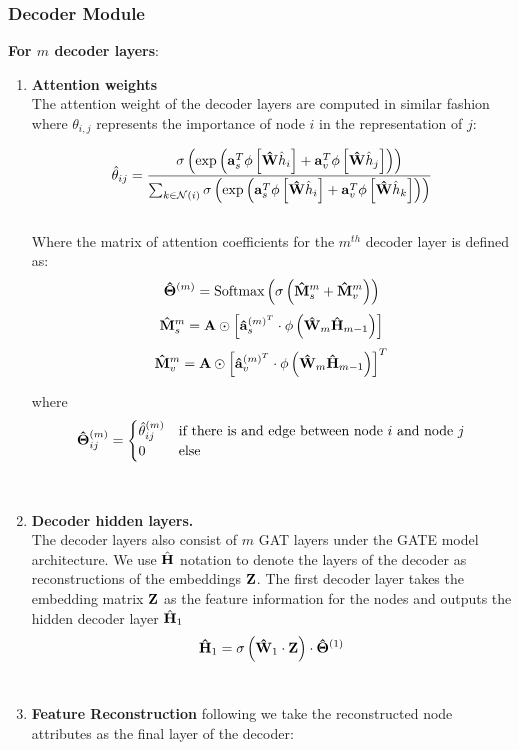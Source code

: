 \documentclass[a4paper,12pt]{article}
\newcommand{\forceindent}{\leavevmode{\parindent=2em\indent}}
\begin{document}
	\subsubsection{Decoder Module} 
		\forceindent \textbf{For $m$ decoder layers}:
		\begin{enumerate}
			\item[]{\textbf{Attention weights} \\
				The attention weight of the decoder layers are computed in similar fashion where $\theta_{i,j}$ represents the importance of node $i$ in the representation of $j$:
				
				\[ \hat{\theta}_{ij} = \frac{\sigma\left(\exp\left({\bf a}_s^T\phi\left[{\bf \hat{W}}\hat{h}_i\right]+{\bf a}_v^T\phi\left[{\bf \hat{W}}\hat{h}_j \right]\right)\right)}
				{\sum_{k\in \mathcal{N}(i)}\sigma\left(\exp\left({\bf a}_s^T\phi\left[{\bf \hat{W}}\hat{h}_i\right]+{\bf a}_v^T\phi\left[{\bf \hat{W}}\hat{h}_k \right]\right)\right)} \]
				\\
				Where the matrix of attention coefficients for the $m^{th}$ decoder layer is defined as:
				\[{\bf \hat{\Theta}}^{(m)} = \text{Softmax}\left(\sigma\left({\bf \hat{M}}_s^{m} + {\bf \hat{M}}_v^{m}\right)\right) \]
				\[{\bf \hat{M}}_s^{m} = {\bf A}\odot \left[{\bf \hat{a}}_s^{(m)^T} \cdot \phi\left({\bf \hat{W}}_{m}{\bf \hat{H}}_{m-1}\right)\right]\]
				\[{\bf \hat{M}}_v^{m} = {\bf A}\odot \left[{\bf \hat{a}}_v^{(m)^T}\cdot \phi\left( {\bf \hat{W}}_{m}{\bf \hat{H}}_{m-1}\right)\right]^T\]
				
				where
				\[ {\bf \hat{\Theta}}_{ij}^{(m)} = \begin{cases} \hat{\theta}_{ij}^{(m)} & \text{if there is and edge between node $i$ and node $j$} \\ 0 & \text{else}\end{cases} \]
				}\\
			\item[]{\textbf{Decoder hidden layers.}\\
				The decoder layers also consist of $m$ GAT layers under the GATE model architecture. We use $\hat{\bf H}$ notation to denote the layers of the decoder as reconstructions of the embeddings $\bf Z$. The first decoder layer takes the embedding matrix $\bf Z$ as the feature information for the nodes and outputs the hidden decoder layer $\hat{\bf H}_1$ 
				\[ {\bf \hat{H}}_{1} = \sigma\left({\bf \hat{W}}_{1}\cdot {\bf Z}\right)\cdot {\bf \hat{\Theta}}^{(1)}\]
			}\\
			\item[]{\textbf{Feature Reconstruction}
				following \cite{salehi2019graph} we take the reconstructed node attributes as the final layer of the decoder:
				
}
\end{enumerate}
\end{document}
